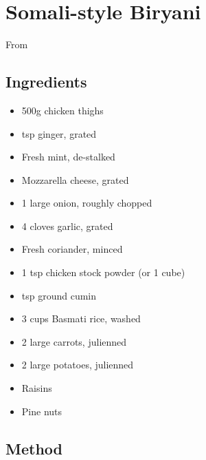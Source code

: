 \clearpage
\section{Somali-style Biryani}


From 

\subsection{Ingredients}

\begin{itemize}
    \item 500g chicken thighs
    \item {} tsp ginger, grated
    \item Fresh mint, de-stalked
    \item Mozzarella cheese, grated
    \item 1 large onion, roughly chopped
    \item 4 cloves garlic, grated
    \item Fresh coriander, minced
    \item 1 tsp chicken stock powder (or 1 cube)
    \item {} tsp ground cumin
    \item 3 cups Basmati rice, washed
    \item 2 large carrots, julienned
    \item 2 large potatoes, julienned
    \item Raisins
    \item Pine nuts
\end{itemize}

\subsection{Method}

